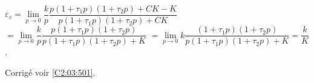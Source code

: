\ifprof
$\varepsilon_v =\lim\limits_{p\to 0} \dfrac{k}{p}\dfrac{p\left(1+\tau_1 p \right)\left(1+\tau_2 p \right)+CK-K}{p\left(1+\tau_1 p \right)\left(1+\tau_2 p \right)+CK}$
$=\lim\limits_{p\to 0} \dfrac{k}{p}\dfrac{p\left(1+\tau_1 p \right)\left(1+\tau_2 p \right)}{p\left(1+\tau_1 p \right)\left(1+\tau_2 p \right)+K}$
$=\lim\limits_{p\to 0} k\dfrac{\left(1+\tau_1 p \right)\left(1+\tau_2 p \right)}{p\left(1+\tau_1 p \right)\left(1+\tau_2 p \right)+K} = \dfrac{k}{K}$.



\else
\fi


 

\ifprof
\else

\noindent\footnotesize
{}
\normalsize

\begin{flushright}
\footnotesize{Corrigé  voir \ref{C2:03:501}.}
\end{flushright}%
\fi